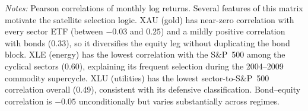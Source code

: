 \documentclass[11pt, a4paper]{article}
\begin{document}
\begin{table}[H]
\centering
\caption{Pairwise Correlation Matrix of Monthly Log Returns (Feb 2004 -- Jul 2026)}
\label{tab:correlations}
\setlength{\tabcolsep}{3.5pt}
\footnotesize
{}
\begin{minipage}{\linewidth}
\vspace{4pt}\footnotesize
\textit{Notes:} Pearson correlations of monthly log returns. Several features of this matrix motivate the satellite selection logic. XAU (gold) has near-zero correlation with every sector ETF (between $-0.03$ and $0.25$) and a mildly positive correlation with bonds (0.33), so it diversifies the equity leg without duplicating the bond block. XLE (energy) has the lowest correlation with the S\&P~500 among the cyclical sectors (0.60), explaining its frequent selection during the 2004--2009 commodity supercycle. XLU (utilities) has the lowest sector-to-S\&P~500 correlation overall (0.49), consistent with its defensive classification. Bond--equity correlation is $-0.05$ unconditionally but varies substantially across regimes.
\end{minipage}
\end{table}
\end{document}
